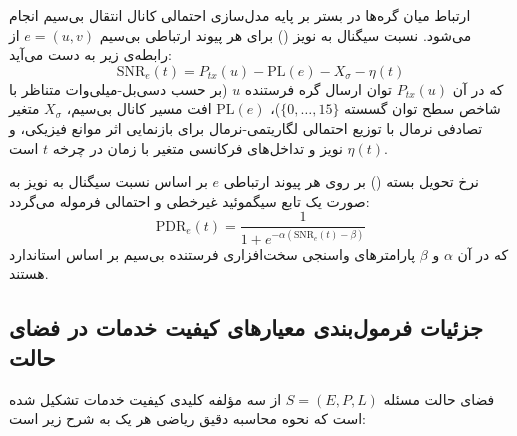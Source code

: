 \documentclass[oneside,openany,phd]{TMU-Thesis}
\begin{document}
ارتباط میان گره‌ها در بستر  بر پایه مدل‌سازی احتمالی کانال انتقال بی‌سیم انجام می‌شود. نسبت سیگنال به نویز () برای هر پیوند ارتباطی بی‌سیم $e = (u, v)$ از رابطه‌ی زیر به دست می‌آید:
\begin{equation}
    \text{SNR}_e(t) = P_{tx}(u) - \text{PL}(e) - X_\sigma - \eta(t)
\end{equation}
که در آن $P_{tx}(u)$ توان ارسال گره فرستنده $u$ (بر حسب دسی‌بل-میلی‌وات متناظر با شاخص سطح توان گسسته $\{0, \ldots, 15\}$)، $\text{PL}(e)$ افت مسیر کانال بی‌سیم، $X_\sigma$ متغیر تصادفی نرمال با توزیع احتمالی لگاریتمی-نرمال برای بازنمایی اثر موانع فیزیکی، و $\eta(t)$ نویز و تداخل‌های فرکانسی متغیر با زمان در چرخه $t$ است.

نرخ تحویل بسته () بر روی هر پیوند ارتباطی $e$ بر اساس نسبت سیگنال به نویز به صورت یک تابع سیگموئید غیرخطی و احتمالی فرموله می‌گردد:
\begin{equation}
    \text{PDR}_e(t) = \frac{1}{1 + e^{-\alpha (\text{SNR}_e(t) - \beta)}}
\end{equation}
که در آن $\alpha$ و $\beta$ پارامترهای واسنجی سخت‌افزاری فرستنده بی‌سیم بر اساس استاندارد  هستند.

\subsection{جزئیات فرمول‌بندی معیارهای کیفیت خدمات در فضای حالت}

فضای حالت مسئله $S = (E, P, L)$ از سه مؤلفه کلیدی کیفیت خدمات تشکیل شده است که نحوه محاسبه دقیق ریاضی هر یک به شرح زیر است:
\end{document}
